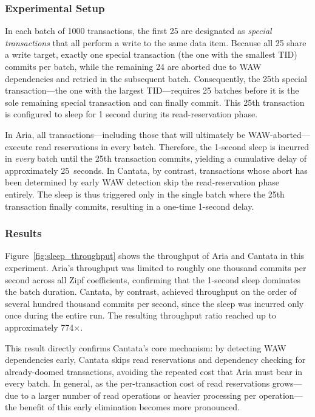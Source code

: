 \documentclass[english,preprint,JIP]{ipsj}
\begin{document}
\subsubsection{Experimental Setup}
In each batch of 1000 transactions, the first 25 are designated as \emph{special transactions} that all perform a write to the same data item. Because all 25 share a write target, exactly one special transaction (the one with the smallest TID) commits per batch, while the remaining 24 are aborted due to WAW dependencies and retried in the subsequent batch. Consequently, the 25th special transaction---the one with the largest TID---requires 25 batches before it is the sole remaining special transaction and can finally commit. This 25th transaction is configured to sleep for 1 second during its read-reservation phase.

In Aria, all transactions---including those that will ultimately be WAW-aborted---execute read reservations in every batch. Therefore, the 1-second sleep is incurred in \emph{every} batch until the 25th transaction commits, yielding a cumulative delay of approximately 25~seconds. In Cantata, by contrast, transactions whose abort has been determined by early WAW detection skip the read-reservation phase entirely. The sleep is thus triggered only in the single batch where the 25th transaction finally commits, resulting in a one-time 1-second delay.

\subsubsection{Results}
Figure~\ref{fig:sleep_throughput} shows the throughput of Aria and Cantata in this experiment. Aria's throughput was limited to roughly one thousand commits per second across all Zipf coefficients, confirming that the 1-second sleep dominates the batch duration. Cantata, by contrast, achieved throughput on the order of several hundred thousand commits per second, since the sleep was incurred only once during the entire run. The resulting throughput ratio reached up to approximately 774$\times$.

This result directly confirms Cantata's core mechanism: by detecting WAW dependencies early, Cantata skips read reservations and dependency checking for already-doomed transactions, avoiding the repeated cost that Aria must bear in every batch. In general, as the per-transaction cost of read reservations grows---due to a larger number of read operations or heavier processing per operation---the benefit of this early elimination becomes more pronounced.
\end{document}
